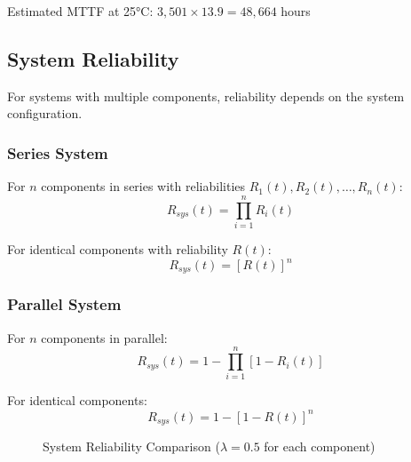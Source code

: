 \documentclass[twoside]{book}
\begin{document}
Estimated MTTF at 25°C: $3,501 \times 13.9 = 48,664$ hours


\subsection{System Reliability}

For systems with multiple components, reliability depends on the system configuration.

\subsubsection{Series System}

For $n$ components in series with reliabilities $R_1(t), R_2(t), \ldots, R_n(t)$:
\begin{equation}
R_{sys}(t) = \prod_{i=1}^n R_i(t)
\end{equation}

For identical components with reliability $R(t)$:
\begin{equation}
R_{sys}(t) = [R(t)]^n
\end{equation}

\subsubsection{Parallel System}

For $n$ components in parallel:
\begin{equation}
R_{sys}(t) = 1 - \prod_{i=1}^n [1 - R_i(t)]
\end{equation}

For identical components:
\begin{equation}
R_{sys}(t) = 1 - [1 - R(t)]^n
\end{equation}

\begin{figure}[h]
\centering
{}
\caption{System Reliability Comparison ($\lambda = 0.5$ for each component)}
\end{figure}
\end{document}
